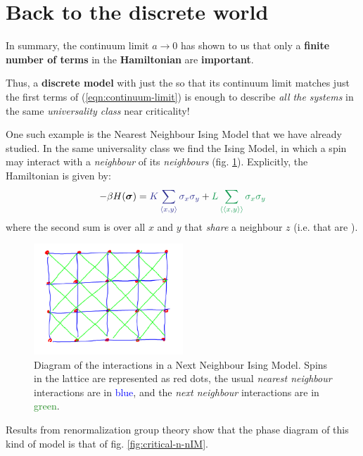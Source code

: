 \documentclass[../../main.tex]{subfiles}
\begin{document}
\section{Back to the discrete world}
In summary, the continuum limit $a \to 0$ has shown to us that only a \textbf{finite number of terms} in the \textbf{Hamiltonian} are \textbf{important}. 

Thus, a \textbf{discrete model} with just the  so that its continuum limit matches just the first terms of (\ref{eqn:continuum-limit}) is enough to describe \textit{all the systems} in the same \textit{universality class} near criticality!

\medskip

One such example is the Nearest Neighbour Ising Model that we have already studied. In the same universality class we find the  Ising Model, in which a spin may interact with a \textit{neighbour} of its \textit{neighbours} (fig. \ref{fig:n-nIM}). Explicitly, the Hamiltonian is given by:
\begin{align*}
    -\beta H(\bm{\sigma}) = \textcolor{Blue}{K \sum_{\langle x,y \rangle} \sigma_x \sigma_y} + \textcolor{ForestGreen}{L \sum_{\langle \langle x,y \rangle \rangle} \sigma_x \sigma_y}
\end{align*}
where the second sum is over all $x$ and $y$ that \textit{share} a neighbour $z$ (i.e. that are ).

\begin{figure}[H]
    \centering
    \includegraphics[width=0.5\textwidth]{n-nIM.png}
    \caption{Diagram of the interactions in a Next Neighbour Ising Model. Spins in the lattice are represented as red dots, the usual \textit{nearest neighbour} interactions are in \textcolor{Blue}{blue}, and the \textit{next neighbour} interactions are in \textcolor{ForestGreen}{green}.}
    \label{fig:n-nIM}
\end{figure}

Results from renormalization group theory show that the phase diagram of this kind of model is that of fig. \ref{fig:critical-n-nIM}.
\end{document}
